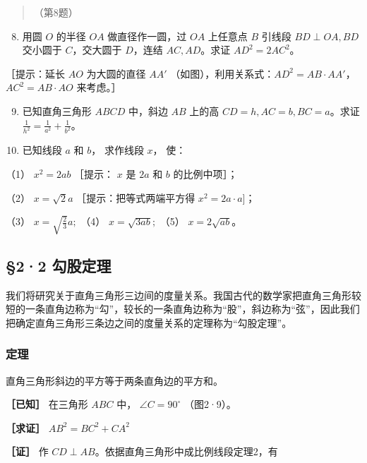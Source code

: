 \begin{quote}
（第8题）
\end{quote}

\begin{enumerate}
\setcounter{enumi}{7}
\item
  用圆 \(O\) 的半径 \(OA\) 做直径作一圆，过 \(OA\) 上任意点 \(B\) 引线段
  \(BD \perp OA, BD\) 交小圆于 \(C\)，交大圆于 \(D\)，连结
  \(AC, AD\)。求证 \(AD^2 = 2AC^2\)。
\end{enumerate}

［提示：延长 \(AO\) 为大圆的直径 \(AA'\)
（如图），利用关系式：\(AD^2 = AB \cdot AA'\)，\(AC^2 = AB \cdot AO\)
来考虑。］

\begin{enumerate}
\setcounter{enumi}{8}
\item
  已知直角三角形 \(ABCD\) 中，斜边 \(AB\) 上的高
  \(CD = h, AC = b, BC = a\)。求证
  \(\frac{1}{h^2} = \frac{1}{a^2} + \frac{1}{b^2}\)。
\item
  已知线段 \(a\) 和 \(b\)， 求作线段 \(x\)， 使：
\end{enumerate}

（1） \(x^{2} = 2ab\) ［提示： \(x\) 是 \(2a\) 和 \(b\) 的比例中项］；

（2） \(x = \sqrt{2} a\) ［提示：把等式两端平方得
\(x^{2} = 2a\cdot a]\)；

（3） \(x = \sqrt{\frac{2}{3}} a;\) （4） \(x = \sqrt{3ab};\) （5）
\(x = 2\sqrt{ab}\)。

\subsection{§2·2 勾股定理}

我们将研究关于直角三角形三边间的度量关系。我国古代的数学家把直角三角形较短的一条直角边称为``勾''，较长的一条直角边称为``股''，斜边称为``弦''，因此我们把确定直角三角形三条边之间的度量关系的定理称为``勾股定理''。

\subsubsection{定理}

直角三角形斜边的平方等于两条直角边的平方和。

\textbf{［已知］} 在三角形 \(ABC\) 中， \(\angle C = 90^{\circ}\)
（图2·9）。

\textbf{［求证］} \(AB^{2} = BC^{2} + CA^{2}\)

\textbf{［证］} 作 \(CD \perp AB\)。依据直角三角形中成比例线段定理2，有

